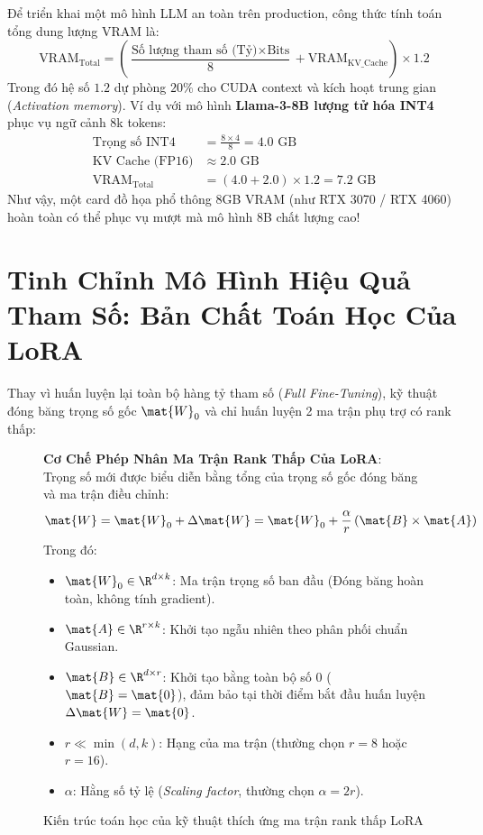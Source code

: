 \begin{workedexamplebox}
Để triển khai một mô hình LLM an toàn trên production, công thức tính toán tổng dung lượng VRAM là:
\[
\text{VRAM}_{\text{Total}} = \left( \frac{\text{Số lượng tham số (Tỷ)} \times \text{Bits}}{8} + \text{VRAM}_{\text{KV\_Cache}} \right) \times 1.2
\]
Trong đó hệ số $1.2$ dự phòng $20\%$ cho CUDA context và kích hoạt trung gian (\textit{Activation memory}).
Ví dụ với mô hình \textbf{Llama-3-8B lượng tử hóa INT4} phục vụ ngữ cảnh 8k tokens:
\begin{align*}
\text{Trọng số INT4} &= \frac{8 \times 4}{8} = 4.0\text{ GB} \\
\text{KV Cache (FP16)} &\approx 2.0\text{ GB} \\
\text{VRAM}_{\text{Total}} &= (4.0 + 2.0) \times 1.2 = 7.2\text{ GB}
\end{align*}
Như vậy, một card đồ họa phổ thông 8GB VRAM (như RTX 3070 / RTX 4060) hoàn toàn có thể phục vụ mượt mà mô hình 8B chất lượng cao!
\end{workedexamplebox}

\section{Tinh Chỉnh Mô Hình Hiệu Quả Tham Số: Bản Chất Toán Học Của LoRA}
\label{sec:prod-lora}

Thay vì huấn luyện lại toàn bộ hàng tỷ tham số (\textit{Full Fine-Tuning}), kỹ thuật  đóng băng trọng số gốc $\mat{W}_0$ và chỉ huấn luyện 2 ma trận phụ trợ có rank thấp:

\begin{figure}[htbp]
\centering
\begin{tcolorbox}[colback=boxbg,colframe=primarycolor,width=0.95\textwidth,arc=2pt]
\small
\textbf{Cơ Chế Phép Nhân Ma Trận Rank Thấp Của LoRA}:\\[0.2cm]
Trọng số mới được biểu diễn bằng tổng của trọng số gốc đóng băng và ma trận điều chỉnh:
\[
\mat{W} = \mat{W}_0 + \Delta \mat{W} = \mat{W}_0 + \frac{\alpha}{r} \left( \mat{B} \times \mat{A} \right)
\]
Trong đó:
\begin{itemize}
  \item $\mat{W}_0 \in \R^{d \times k}$: Ma trận trọng số ban đầu (Đóng băng hoàn toàn, không tính gradient).
  \item $\mat{A} \in \R^{r \times k}$: Khởi tạo ngẫu nhiên theo phân phối chuẩn Gaussian.
  \item $\mat{B} \in \R^{d \times r}$: Khởi tạo bằng toàn bộ số 0 ($\mat{B} = \mat{0}$), đảm bảo tại thời điểm bắt đầu huấn luyện $\Delta \mat{W} = \mat{0}$.
  \item $r \ll \min(d, k)$: Hạng của ma trận (thường chọn $r = 8$ hoặc $r = 16$).
  \item $\alpha$: Hằng số tỷ lệ (\textit{Scaling factor}, thường chọn $\alpha = 2r$).
\end{itemize}
\end{tcolorbox}
\caption{Kiến trúc toán học của kỹ thuật thích ứng ma trận rank thấp LoRA}
\label{fig:lora-mechanics}
\end{figure}


